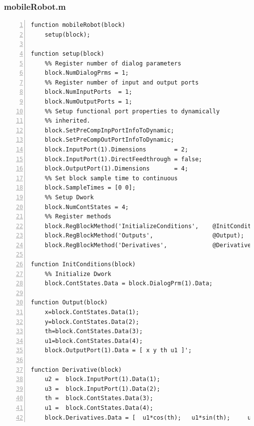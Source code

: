 \documentclass[11pt, a4paper, oneside, openany, reqno]{book}
\theoremstyle{definition}
\theoremstyle{remark}
\numberwithin{equation}{chapter} %
\begin{document}
\subsubsection{mobileRobot.m}
\begin{footnotesize}
\begin{Verbatim}[fontfamily=cmtt,baselinestretch=0,numbers=left]
function mobileRobot(block)
    setup(block);

function setup(block)
    %% Register number of dialog parameters   
    block.NumDialogPrms = 1;
    %% Register number of input and output ports
    block.NumInputPorts  = 1;
    block.NumOutputPorts = 1;
    %% Setup functional port properties to dynamically
    %% inherited.
    block.SetPreCompInpPortInfoToDynamic;
    block.SetPreCompOutPortInfoToDynamic; 
    block.InputPort(1).Dimensions        = 2;
    block.InputPort(1).DirectFeedthrough = false;  
    block.OutputPort(1).Dimensions       = 4;  
    %% Set block sample time to continuous
    block.SampleTimes = [0 0];  
    %% Setup Dwork
    block.NumContStates = 4;
    %% Register methods
    block.RegBlockMethod('InitializeConditions',    @InitConditions);  
    block.RegBlockMethod('Outputs',                 @Output);  
    block.RegBlockMethod('Derivatives',             @Derivative);  

function InitConditions(block)
    %% Initialize Dwork
    block.ContStates.Data = block.DialogPrm(1).Data;

function Output(block)
    x=block.ContStates.Data(1);
    y=block.ContStates.Data(2);
    th=block.ContStates.Data(3);
    u1=block.ContStates.Data(4);
    block.OutputPort(1).Data = [ x y th u1 ]';

function Derivative(block)
    u2 =  block.InputPort(1).Data(1);
    u3 =  block.InputPort(1).Data(2);
    th =  block.ContStates.Data(3);  
    u1 =  block.ContStates.Data(4);        
    block.Derivatives.Data = [  u1*cos(th);   u1*sin(th);     u2;   u3];
\end{Verbatim}
\end{footnotesize}
\end{document}
